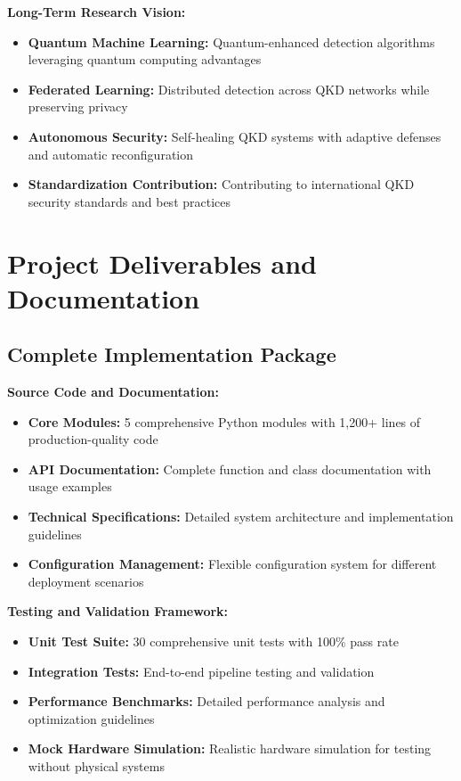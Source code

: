 \documentclass[12pt,a4paper]{article}
\begin{document}
\textbf{Long-Term Research Vision:}
\begin{itemize}
    \item \textbf{Quantum Machine Learning:} Quantum-enhanced detection algorithms leveraging quantum computing advantages
    \item \textbf{Federated Learning:} Distributed detection across QKD networks while preserving privacy
    \item \textbf{Autonomous Security:} Self-healing QKD systems with adaptive defenses and automatic reconfiguration
    \item \textbf{Standardization Contribution:} Contributing to international QKD security standards and best practices
\end{itemize}

\section{Project Deliverables and Documentation}

\subsection{Complete Implementation Package}

\textbf{Source Code and Documentation:}
\begin{itemize}
    \item \textbf{Core Modules:} 5 comprehensive Python modules with 1,200+ lines of production-quality code
    \item \textbf{API Documentation:} Complete function and class documentation with usage examples
    \item \textbf{Technical Specifications:} Detailed system architecture and implementation guidelines
    \item \textbf{Configuration Management:} Flexible configuration system for different deployment scenarios
\end{itemize}

\textbf{Testing and Validation Framework:}
\begin{itemize}
    \item \textbf{Unit Test Suite:} 30 comprehensive unit tests with 100\% pass rate
    \item \textbf{Integration Tests:} End-to-end pipeline testing and validation
    \item \textbf{Performance Benchmarks:} Detailed performance analysis and optimization guidelines
    \item \textbf{Mock Hardware Simulation:} Realistic hardware simulation for testing without physical systems
\end{itemize}
\end{document}
